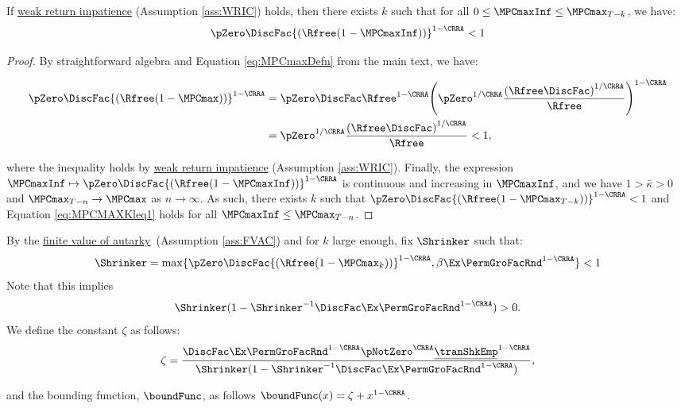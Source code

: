 \documentclass[\econtexRoot/BufferStockTheory]{subfiles}
\begin{document}
\begin{claim}\label{claim:MPCMAXKleq1}
If \hyperlink{WRIC}{weak return impatience} (Assumption \ref{ass:WRIC}) holds, then there exists $k$ such that for all $0\leq\MPCmaxInf\leq \MPCmax_{T-k}$, we have:
%
\begin{equation}\label{eq:MPCMAXKleq1}
  \pZero \DiscFac {(\Rfree (1-\MPCmaxInf))}^{1-\CRRA}   < 1
\end{equation}
%
\end{claim}
\begin{proof}

By straightforward algebra and Equation \eqref{eq:MPCmaxDefn} from the main text, we have:

\begin{align}
\pZero \DiscFac {(\Rfree (1-\MPCmax))}^{1-\CRRA}  & = \pZero\DiscFac\Rfree^{1-\CRRA}{\left(\pZero^{1/\CRRA}\frac{{(\Rfree\DiscFac)}^{1/\CRRA}}{\Rfree}\right)}^{1-\CRRA} \\\notag
& = \pZero^{1/\CRRA}\frac{{(\Rfree\DiscFac)}^{1/\CRRA}}{\Rfree} <1 \notag,
\end{align}

where the inequality holds by \hyperlink{WRIC}{weak return impatience} (Assumption \ref{ass:WRIC}).
Finally, the expression $\MPCmaxInf\mapsto \pZero \DiscFac {(\Rfree (1-\MPCmaxInf))}^{1-\CRRA} $ is continuous and increasing in $\MPCmaxInf$, and we have $1>\bar{\kappa}>0$ and $\MPCmax_{T-n} \rightarrow \MPCmax$ as $n\rightarrow\infty$. As such, there exists $k$ such that $\pZero \DiscFac {(\Rfree (1-\MPCmax_{T-k}))}^{1-\CRRA}<1$ and Equation \eqref{eq:MPCMAXKleq1} holds for all $\MPCmaxInf\leq \MPCmax_{T-n}$. 

\end{proof}


\begin{remark}\label{rem:shnkrdef}
By the \hyperlink{FVAC}{finite value of autarky}~(Assumption \ref{ass:FVAC}) and for $k$ large enough, fix $\Shrinker$ such that:
%
\begin{equation}\label{eq:shnkrdef}
\Shrinker = \max\{\pZero \DiscFac {(\Rfree (1-\MPCmax_{k}))}^{1-\CRRA},\beta\Ex\PermGroFacRnd^{1-\CRRA}\}<1
\end{equation}
%
Note that this implies
%
\begin{equation}\label{eq:shrnkrCond}
\Shrinker(1- \Shrinker^{-1}\DiscFac \Ex\PermGroFacRnd^{1-\CRRA })>0. 
\end{equation}
%
We define the constant $\zeta$ as follows:
%
\begin{equation}\label{eq:Mbarddef}
\zeta = \frac{\DiscFac \Ex \PermGroFacRnd^{1-\CRRA }\pNotZero^{\CRRA}\underline{\tranShkEmp}^{1-\CRRA}}{\Shrinker(1- \Shrinker^{-1}\DiscFac \Ex \PermGroFacRnd^{1-\CRRA })}, 
\end{equation}

and the bounding function, $\boundFunc$, as follows $\boundFunc(x) = \zeta +  x^{1-\CRRA}$. 

\end{remark}
\end{document}
